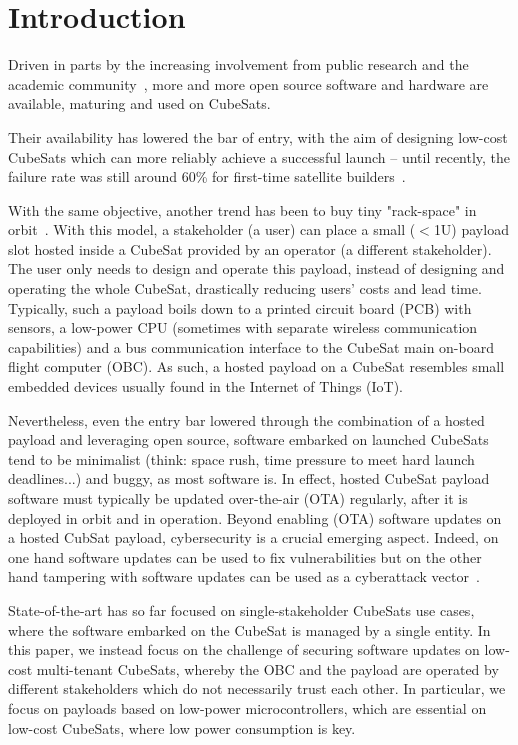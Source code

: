 \section{Introduction}
\label{sec:introduction}

Driven in parts by the increasing involvement from public research and the academic
community~\cite{cubesat101}, more and more open source software and hardware are available,
maturing and used on CubeSats.

Their availability has lowered the bar of entry, with the aim of designing low-cost
CubeSats which can more reliably achieve a successful launch -- until recently, the
failure rate was still around 60\% for first-time satellite builders~\cite{Holliday2019PyCubed}.

With the same objective, another trend has been to buy tiny "rack-space" in
orbit~\cite{satrevolution2020}. With this model, a stakeholder (a user) can place
a small ($<$1U) payload slot hosted inside a CubeSat provided by an operator
(a different stakeholder). The user only needs to design and operate this payload,
instead of designing and operating the whole CubeSat, drastically reducing users'
costs and lead time. Typically, such a payload boils down to a printed circuit board
(PCB) with sensors, a low-power CPU (sometimes with separate wireless communication
capabilities) and a bus communication interface to the CubeSat main on-board flight
computer (OBC). As such, a hosted payload on a CubeSat resembles small embedded
devices usually found in the Internet of Things (IoT).

Nevertheless, even the entry bar lowered through the combination of a hosted payload
and leveraging open source, software embarked on launched CubeSats tend to be
minimalist (think: space rush, time pressure to meet hard launch deadlines...)
and buggy, as most software is. In effect, hosted CubeSat payload software must
typically be updated over-the-air (OTA) regularly, after it is deployed in orbit
and in operation. Beyond enabling (OTA) software updates on a hosted CubSat payload,
cybersecurity is a crucial emerging aspect. Indeed, on one hand software
updates can  be used to fix vulnerabilities but on the other hand tampering with
software updates can be used as a cyberattack vector~\cite{ccleaner}.

State-of-the-art has so far focused on single-stakeholder CubeSats use cases,
where the software embarked on the CubeSat is managed by a single entity. In
this paper, we instead focus on the challenge of securing software updates on low-cost
multi-tenant CubeSats, whereby the OBC and the payload are operated by different
stakeholders which do not necessarily trust each other. In particular, we focus on payloads
based on low-power microcontrollers, which are essential on low-cost CubeSats, where
low power consumption is key.
